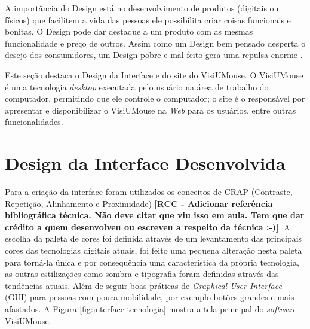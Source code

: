 A importância do Design está no desenvolvimento de produtos (digitais ou físicos) que facilitem a vida das pessoas ele possibilita criar coisas funcionais e bonitas. O Design pode dar destaque a um produto com as mesmas funcionalidade e preço de outros. %
Assim como um Design bem pensado desperta o desejo dos consumidores, um Design pobre e mal feito gera uma repulsa enorme \cite{patterson2017computer}.

Este seção destaca o Design da Interface e do site do VisiUMouse. O VisiUMouse é uma tecnologia \textit{desktop} executada pelo usuário na área de trabalho do computador, permitindo que ele controle o computador; o site é o responsável por apresentar e disponibilizar o VisiUMouse na \textit{Web} para os usuários, entre outras funcionalidades.

\section{Design da Interface Desenvolvida}\label{Sub:software}
Para a criação da interface foram utilizados os conceitos de CRAP (Contraste, Repetição, Alinhamento e Proximidade) \textbf{[RCC - Adicionar referência bibliográfica técnica. Não deve citar que viu isso em aula. Tem que dar crédito a quem desenvolveu ou escreveu a respeito da técnica :-)]}. %
A escolha da paleta de cores foi definida através de um levantamento das principais cores das tecnologias digitais atuais, foi feito uma pequena alteração nesta paleta para torná-la única e por consequência uma característica da própria tecnologia, as outras estilizações como sombra e tipografia foram definidas através das tendências atuais. Além de seguir boas práticas de \textit{Graphical User Interface} (GUI) para pessoas com pouca mobilidade, por exemplo botões grandes e mais afastados. A Figura \ref{fig:interface-tecnologia} mostra a tela principal do \textit{software} VisiUMouse.

